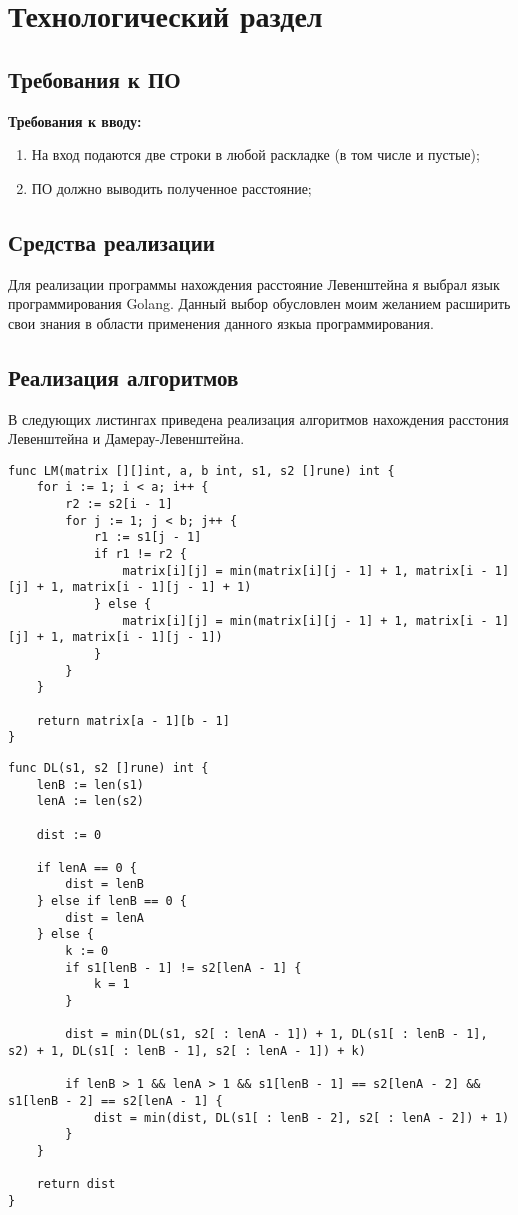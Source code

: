 \chapter{Технологический раздел}

\section{Требования к ПО}
\textbf{Требования к вводу:}
\begin{enumerate}
	\item На вход подаются две строки в любой раскладке (в том числе и пустые);
	\item ПО должно выводить полученное расстояние;
\end{enumerate}

\section{Средства реализации}
Для реализации программы нахождения расстояние Левенштейна я выбрал язык программирования Golang. Данный
выбор обусловлен моим желанием расширить свои знания в области применения данного язкыа программирования.

\clearpage

\section{Реализация алгоритмов}
В следующих листингах приведена реализация алгоритмов нахождения расстония Левенштейна и Дамерау-Левенштейна.

\begin{lstlisting}[label=lst:LM,caption=Функция нахождения расстояния Левенштейна нерекурсивным способом]
func LM(matrix [][]int, a, b int, s1, s2 []rune) int { 
	for i := 1; i < a; i++ {
		r2 := s2[i - 1]
		for j := 1; j < b; j++ {
			r1 := s1[j - 1]
			if r1 != r2 {
				matrix[i][j] = min(matrix[i][j - 1] + 1, matrix[i - 1][j] + 1, matrix[i - 1][j - 1] + 1)
			} else {
				matrix[i][j] = min(matrix[i][j - 1] + 1, matrix[i - 1][j] + 1, matrix[i - 1][j - 1])
			}
		}
	}

	return matrix[a - 1][b - 1]
}
\end{lstlisting}

\begin{lstlisting}[label=lst:DL,caption=Функция нахождения расстояния Левенштейна-Дамерау с помощью рекурсии]
func DL(s1, s2 []rune) int {
    lenB := len(s1)
    lenA := len(s2)

    dist := 0 

    if lenA == 0 {
        dist = lenB
    } else if lenB == 0 {
        dist = lenA
    } else {
        k := 0
        if s1[lenB - 1] != s2[lenA - 1] {
            k = 1
        }	

        dist = min(DL(s1, s2[ : lenA - 1]) + 1, DL(s1[ : lenB - 1], s2) + 1, DL(s1[ : lenB - 1], s2[ : lenA - 1]) + k)

        if lenB > 1 && lenA > 1 && s1[lenB - 1] == s2[lenA - 2] && s1[lenB - 2] == s2[lenA - 1] {
            dist = min(dist, DL(s1[ : lenB - 2], s2[ : lenA - 2]) + 1)
        }
    }

    return dist
}
\end{lstlisting}

